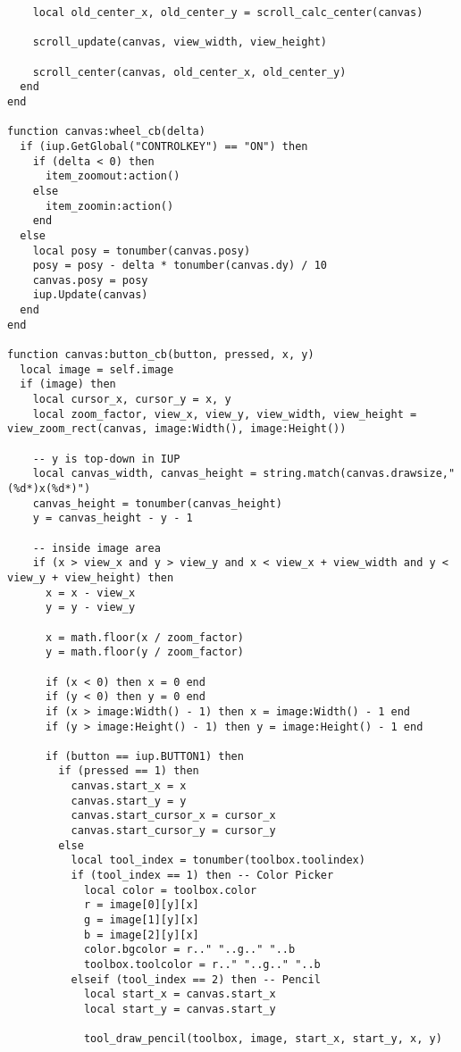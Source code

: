 \documentclass{ctexart}
\begin{document}
\begin{lstlisting}
    local old_center_x, old_center_y = scroll_calc_center(canvas)

    scroll_update(canvas, view_width, view_height)

    scroll_center(canvas, old_center_x, old_center_y)
  end
end

function canvas:wheel_cb(delta)
  if (iup.GetGlobal("CONTROLKEY") == "ON") then
    if (delta < 0) then
      item_zoomout:action()
    else
      item_zoomin:action()
    end
  else
    local posy = tonumber(canvas.posy)
    posy = posy - delta * tonumber(canvas.dy) / 10
    canvas.posy = posy
    iup.Update(canvas)
  end
end

function canvas:button_cb(button, pressed, x, y)
  local image = self.image
  if (image) then
    local cursor_x, cursor_y = x, y
    local zoom_factor, view_x, view_y, view_width, view_height = view_zoom_rect(canvas, image:Width(), image:Height())

    -- y is top-down in IUP
    local canvas_width, canvas_height = string.match(canvas.drawsize,"(%d*)x(%d*)") 
    canvas_height = tonumber(canvas_height)
    y = canvas_height - y - 1

    -- inside image area
    if (x > view_x and y > view_y and x < view_x + view_width and y < view_y + view_height) then
      x = x - view_x
      y = y - view_y

      x = math.floor(x / zoom_factor)
      y = math.floor(y / zoom_factor)

      if (x < 0) then x = 0 end
      if (y < 0) then y = 0 end
      if (x > image:Width() - 1) then x = image:Width() - 1 end
      if (y > image:Height() - 1) then y = image:Height() - 1 end

      if (button == iup.BUTTON1) then
        if (pressed == 1) then
          canvas.start_x = x
          canvas.start_y = y
          canvas.start_cursor_x = cursor_x
          canvas.start_cursor_y = cursor_y
        else
          local tool_index = tonumber(toolbox.toolindex)
          if (tool_index == 1) then -- Color Picker 
            local color = toolbox.color
            r = image[0][y][x]
            g = image[1][y][x]
            b = image[2][y][x]
            color.bgcolor = r.." "..g.." "..b
            toolbox.toolcolor = r.." "..g.." "..b
          elseif (tool_index == 2) then -- Pencil
            local start_x = canvas.start_x
            local start_y = canvas.start_y
            
            tool_draw_pencil(toolbox, image, start_x, start_y, x, y)            
  

\end{lstlisting}
\end{document}
